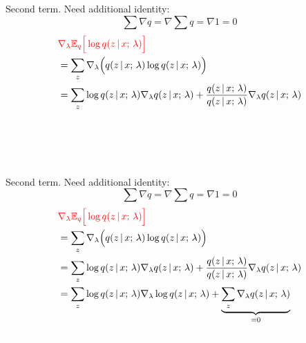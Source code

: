 \begin{frame}
Second term. Need additional identity:
\[\sum \nabla q = \nabla \sum q = \nabla 1 = 0 \]
\vspace{-5mm}
\begin{align*}
    &{\color{red} \nabla_\lambda  \E_{q}\Big[\log q(z \given x \param \lambda) \Big] }\\
    &= \sum_{z} \nabla_\lambda \Big ( q(z \given x\param \lambda) \log q(z \given x \param \lambda)\Big) \\
    & = \sum_{z}  \log q(z \given x \param \lambda) \nabla_\lambda q(z \given x \param \lambda) +  \frac{q(z \given x \param \lambda)}{q(z \given x \param \lambda)}\nabla_\lambda q(z \given x \param \lambda) \\
    &{\color{white}= \sum_{z}  \log q(z \given x \param \lambda) \nabla_\lambda \log q(z \given x \param \lambda) + \underbrace{\sum_z \nabla_\lambda q(z \given x \param \lambda)}_{= 0}} \\
    &{\color{white}= \E_{q}[\log q (z \given x \param \lambda) \nabla_\lambda q (z \given x \param \lambda)]}
\end{align*}
\end{frame}

\begin{frame}
Second term. Need additional identity:
\[\sum \nabla q = \nabla \sum q = \nabla 1 = 0 \]
\vspace{-5mm}
\begin{align*}
    &{\color{red} \nabla_\lambda  \E_{q}\Big[\log q(z \given x \param \lambda) \Big] }\\
    &= \sum_{z} \nabla_\lambda \Big ( q(z \given x\param \lambda) \log q(z \given x \param \lambda)\Big) \\
    &= \sum_{z}  \log q(z \given x \param \lambda) \nabla_\lambda q(z \given x \param \lambda) +  \frac{q(z \given x \param \lambda)}{q(z \given x \param \lambda)}\nabla_\lambda q(z \given x \param \lambda) \\
    &= \sum_{z}  \log q(z \given x \param \lambda) \nabla_\lambda \log q(z \given x \param \lambda) + \underbrace{\sum_z \nabla_\lambda q(z \given x \param \lambda)}_{= 0} \\
    &{\color{white}= \E_{q}[\log q (z \given x \param \lambda) \nabla_\lambda q (z \given x \param \lambda)]}
\end{align*}
\end{frame}

